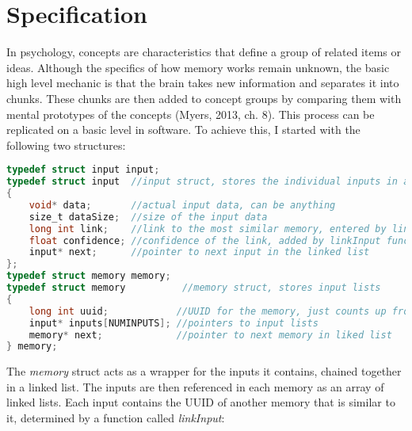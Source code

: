 \documentclass{report}
\begin{document}
\section{Specification}
In psychology, concepts are characteristics that define a group of related items or ideas. Although the specifics of how memory works remain unknown, the basic high level mechanic is that the brain takes new information and separates it into chunks. These chunks are then added to concept groups by comparing them with mental prototypes of the concepts (Myers, 2013, ch. 8). This process can be replicated on a basic level in software. To achieve this, I started with the following two structures:
\lstset{style=ccode}
\begin{lstlisting}[language=C]
typedef struct input input;
typedef struct input  //input struct, stores the individual inputs in a linked list.
{
    void* data;       //actual input data, can be anything
    size_t dataSize;  //size of the input data
    long int link;    //link to the most similar memory, entered by linkInput function
    float confidence; //confidence of the link, added by linkInput function
    input* next;      //pointer to next input in the linked list
};
typedef struct memory memory;
typedef struct memory          //memory struct, stores input lists
{
    long int uuid;            //UUID for the memory, just counts up from 0
    input* inputs[NUMINPUTS]; //pointers to input lists
    memory* next;             //pointer to next memory in liked list
} memory;
\end{lstlisting}
The \textit{memory} struct acts as a wrapper for the inputs it contains, chained together in a linked list. The inputs are then referenced in each memory as an array of linked lists. Each input contains the UUID of another memory that is similar to it, determined by a function called \textit{linkInput}:
\lstset{style=ccode}
\end{document}

